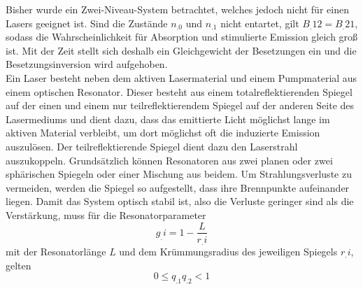 Bisher wurde ein Zwei-Niveau-System betrachtet, welches jedoch nicht für einen Lasers geeignet ist. Sind die Zustände $n_.0$ und $n_.1$ nicht entartet, gilt
$B_.{12}=B_.{21}$, sodass die Wahrscheinlichkeit für Absorption und stimulierte Emission gleich groß ist. Mit der Zeit stellt sich deshalb ein Gleichgewicht der Besetzungen ein und die Besetzungsinversion wird aufgehoben.\\ 
Ein Laser besteht neben dem aktiven Lasermaterial und einem Pumpmaterial aus einem optischen Resonator.
Dieser besteht aus einem totalreflektierenden Spiegel auf der einen und einem nur teilreflektierendem Spiegel auf der anderen Seite des Lasermediums und dient dazu, dass das emittierte Licht möglichst lange im aktiven Material verbleibt, um dort möglichst oft die induzierte Emission auszulösen. Der teilreflektierende Spiegel dient dazu den Laserstrahl auszukoppeln. Grundsätzlich können Resonatoren aus zwei planen oder zwei sphärischen Spiegeln oder einer Mischung aus beidem. Um Strahlungsverluste zu vermeiden, werden die Spiegel so aufgestellt, dass ihre Brennpunkte aufeinander liegen. Damit das System optisch stabil ist, also die Verluste geringer sind als die Verstärkung, muss für die Resonatorparameter
\[
g_.i = 1 - \frac{L}{r_.i}
\]
mit der Resonatorlänge $L$ und dem Krümmungsradius des jeweiligen Spiegels $r_.i$, gelten
\begin{equation}
0 \leq q_.1q_.2 < 1
\end{equation}